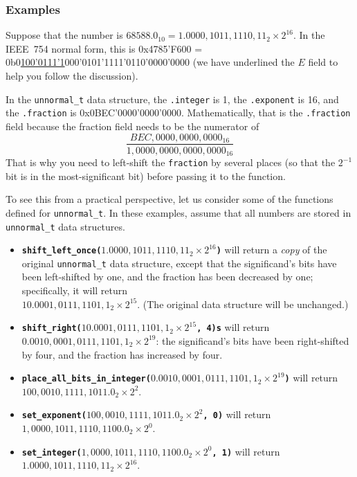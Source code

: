\subsubsection*{Examples}

Suppose that the number is $68588.0_{10} = 1.0000,1011,1110,11_{2} \times 2^{16}$.
In the IEEE~754 normal form, this is 0x4785'F600 = 0b0\underline{100'0111'1}000'0101'1111'0110'0000'0000 (we have underlined the $E$ field to help you follow the discussion).

In the \lstinline{unnormal_t} data structure, the \lstinline{.integer} is 1, the \lstinline{.exponent} is 16, and the \lstinline{.fraction} is 0x0BEC'0000'0000'0000.
Mathematically, that is the \lstinline{.fraction} field because the fraction field needs to be the numerator of
\[\frac{BEC,0000,0000,0000_{16}}{1,0000,0000,0000,0000_{16}}\]
That is why you need to left-shift the \lstinline{fraction} by several places (so that the $2^{-1}$ bit is in the most-significant bit) before passing it to the  function.

To see this from a practical perspective, let us consider some of the functions defined for \lstinline{unnormal_t}.
In these examples, assume that all numbers are stored in \lstinline{unnormal_t} data structures.
\begin{itemize}
    \item \textbf{\texttt{shift\_left\_once($1.0000,1011,1110,11_{2} \times 2^{16}$)}} will return a \textit{copy} of the original \lstinline{unnormal_t} data structure, except that the significand's bits have been left-shifted by one, and the fraction has been decreased by one;
        specifically, it will return \\ $10.0001,0111,1101,1_{2} \times 2^{15}$.
        (The original data structure will be unchanged.)
    \item \textbf{\texttt{shift\_right($10.0001,0111,1101,1_{2} \times 2^{15}$, 4)s}} will return \\
        $0.0010,0001,0111,1101,1_{2} \times 2^{19}$: the significand's bits have been right-shifted by four, and the fraction has increased by four.
    \item \textbf{\texttt{place\_all\_bits\_in\_integer($0.0010,0001,0111,1101,1_{2} \times 2^{19}$)}} will return \\
        $100,0010,1111,1011.0_{2} \times 2^{2}$.
    \item \textbf{\texttt{set\_exponent($100,0010,1111,1011.0_{2} \times 2^{2}$, 0)}} will return  \\
        $1,0000,1011,1110,1100.0_{2} \times 2^{0}$.
    \item \textbf{\texttt{set\_integer($1,0000,1011,1110,1100.0_{2} \times 2^{0}$, 1)}} will return  \\
        $1.0000,1011,1110,11_{2} \times 2^{16}$.
\end{itemize}

